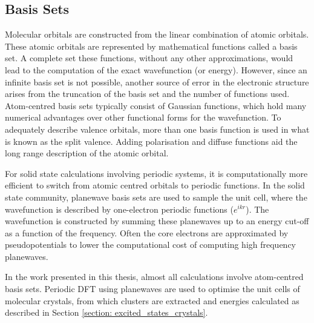 \subsection{Basis Sets}\label{section: methods_basisets}
Molecular orbitals are constructed from the linear combination of atomic orbitals. These atomic orbitals are represented by mathematical functions called a basis set. A complete set these functions, without any other approximations, would lead to the computation of the exact wavefunction (or energy). However, since an infinite basis set is not possible, another source of error in the electronic structure arises from the truncation of the basis set and the number of functions used. Atom-centred basis sets typically consist of Gaussian functions, which hold many numerical advantages over other functional forms for the wavefunction. To adequately describe valence orbitals, more than one basis function is used in what is known as the split valence. Adding polarisation and diffuse functions aid the long range description of the atomic orbital.\cite{Cramer2002}

For solid state calculations involving periodic systems, it is computationally more efficient to switch from atomic centred orbitals to periodic functions. In the solid state community, planewave basis sets are used to sample the unit cell, where the wavefunction is described by one-electron periodic functions ($e^{ikr}$). The wavefunction is constructed by summing these planewaves up to an energy cut-off as a function of the frequency. Often the core electrons are approximated by pseudopotentials to lower the computational cost of computing high frequency planewaves.\cite{Young2001} 

In the work presented in this thesis, almost all calculations involve atom-centred basis sets. Periodic DFT using planewaves are used to optimise the unit cells of molecular crystals, from which clusters are extracted and energies calculated as described in Section \ref{section: excited_states_crystals}. 


